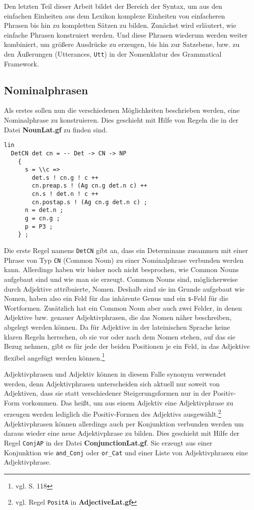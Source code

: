 Den letzten Teil dieser Arbeit bildet der Bereich der Syntax, um aus den einfachen Einheiten aus dem Lexikon komplexe Einheiten von einfacheren Phrasen bis hin zu kompletten Sätzen zu bilden. Zunächst wird erläutert, wie einfache Phrasen konstruiert werden. Und diese Phrasen wiederum werden weiter kombiniert, um größere Ausdrücke zu erzeugen, bis hin zur Satzebene, bzw. zu den Äußerungen (Utterances, \texttt{Utt}) in der Nomenklatur des Grammatical Framework.
\subsection{Nominalphrasen}
\label{subsec:nominalphrasen}
Als erstes sollen nun die verschiedenen Möglichkeiten beschrieben werden, eine Nominalphrase zu konstruieren. Dies geschieht mit Hilfe von Regeln die in der Datei \textbf{NounLat.gf} zu finden sind. \par
\begin{lstlisting}[float=h!tp,caption={Die Syntaxregel \texttt{DetCN}, um ein Determinans und ein Common Nouns zu einer \texttt{NP} zu verbinden (vgl. \textbf{NounLat.gf}},label={GF-Noun-DetCN}]
lin
  DetCN det cn = -- Det -> CN -> NP
    {
      s = \\c => 
        det.s ! cn.g ! c ++ 
        cn.preap.s ! (Ag cn.g det.n c) ++ 
        cn.s ! det.n ! c ++ 
        cn.postap.s ! (Ag cn.g det.n c) ; 
      n = det.n ;  
      g = cn.g ; 
      p = P3 ;
    } ;
\end{lstlisting}
Die erste Regel namens \texttt{DetCN} gibt an, dass ein Determinans zusammen mit einer Phrase von Typ \texttt{CN} (Common Noun) zu einer Nominalphrase verbunden werden kann. Allerdings haben wir bisher noch nicht besprochen, wie Common Nouns aufgebaut sind und wie man sie erzeugt. Common Nouns sind, möglicherweise durch Adjektive attribuierte, Nomen. Deshalb sind sie im Grunde aufgebaut wie Nomen, haben also ein Feld für das inhärente Genus und ein \texttt{s}-Feld für die Wortformen. Zusätzlich hat ein Common Noun aber auch zwei Felder, in denen Adjektive bzw. genauer Adjektivphrasen, die das Nomen näher beschreiben, abgelegt werden können. Da für Adjektive in der lateinischen Sprache keine klaren Regeln herrschen, ob sie vor oder nach dem Nomen stehen, auf das sie Bezug nehmen, gibt es für jede der beiden Positionen je ein Feld, in das Adjektive flexibel angefügt werden können.\footnote{vgl. \cite{BAYER-LINDAUER1994} S. 118} \par
Adjektivphrasen und Adjektiv können in diesem Falle synonym verwendet werden, denn Adjektivphrasen unterscheiden sich aktuell nur soweit von Adjektiven, dass sie statt verschiedener Steigerungsformen nur in der Positiv-Form vorkommen. Das heißt, um aus einem Adjektiv eine Adjektivphrase zu erzeugen werden lediglich die Positiv-Formen des Adjektivs ausgewählt.\footnote{vgl. Regel \texttt{PositA} in \textbf{AdjectiveLat.gf}} Adjektivphrasen können allerdings auch per Konjunktion verbunden werden um daraus wieder eine neue Adjektivphrase zu bilden. Dies geschieht mit Hilfe der Regel \texttt{ConjAP} in der Datei \textbf{ConjunctionLat.gf}. Sie erzeugt aus einer Konjunktion wie \texttt{and\_Conj} oder \texttt{or\_Cat} und einer Liste von Adjektivphrasen eine Adjektivphrase. \par
